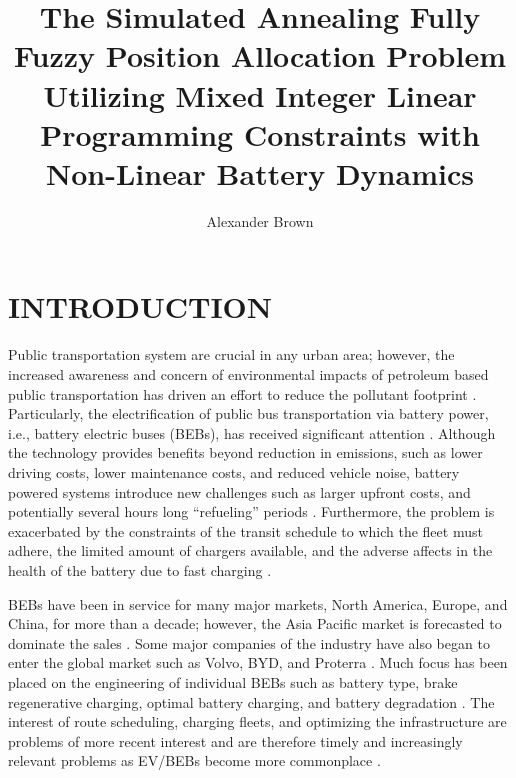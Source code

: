 \documentclass[ee,msthesis]{usuthesis}
\author{Alexander Brown}
\date{}
\title{The Simulated Annealing Fully Fuzzy Position Allocation Problem Utilizing Mixed Integer Linear Programming Constraints with Non-Linear Battery Dynamics}
\begin{document}
\maketitle
\let\ref\autoref                            %

\tableofcontents
\listoftables
\listoffigures

\let\ref\autoref                            %

\body  %

\chapter{INTRODUCTION}
\label{sec:introduction}
Public transportation system are crucial in any urban area; however, the increased awareness and concern of
environmental impacts of petroleum based public transportation has driven an effort to reduce the pollutant footprint
\cite{de-2014-simul-elect,xylia-2018-role-charg,guida-2017-zeeus-repor-europ,li-2016-batter-elect}. Particularly,
the electrification of public bus transportation via battery power, i.e., battery electric buses (BEBs), has received
significant attention \cite{li-2016-batter-elect}. Although the technology provides benefits beyond reduction in
emissions, such as lower driving costs, lower maintenance costs, and reduced vehicle noise, battery powered systems
introduce new challenges such as larger upfront costs, and potentially several hours long ``refueling'' periods
\cite{xylia-2018-role-charg,li-2016-batter-elect}. Furthermore, the problem is exacerbated by the constraints of the
transit schedule to which the fleet must adhere, the limited amount of chargers available, and the adverse affects in
the health of the battery due to fast charging \cite{lutsey-2019-updat-elect}.

BEBs have been in service for many major markets, North America, Europe, and China, for more than a decade; however, the
Asia Pacific market is forecasted to dominate the sales \cite{deng-2021-survey-elect}. Some major companies of the
industry have also began to enter the global market such as Volvo, BYD, and Proterra \cite{deng-2021-survey-elect}.
Much focus has been placed on the engineering of individual BEBs such as battery type, brake regenerative charging,
optimal battery charging, and battery degradation \cite{chen-2008-desig-grey,abdollahi-2016-optim-batter,kühne-2010-elect,deng-2021-survey-elect}. The interest of route scheduling, charging fleets, and optimizing the
infrastructure are problems of more recent interest and are therefore timely and increasingly relevant problems as
EV/BEBs become more commonplace \cite{hoke-2014-accoun-lithium,sebastiani-2016-evaluat-elect,wei-2018-optim-spatio}.
\end{document}
